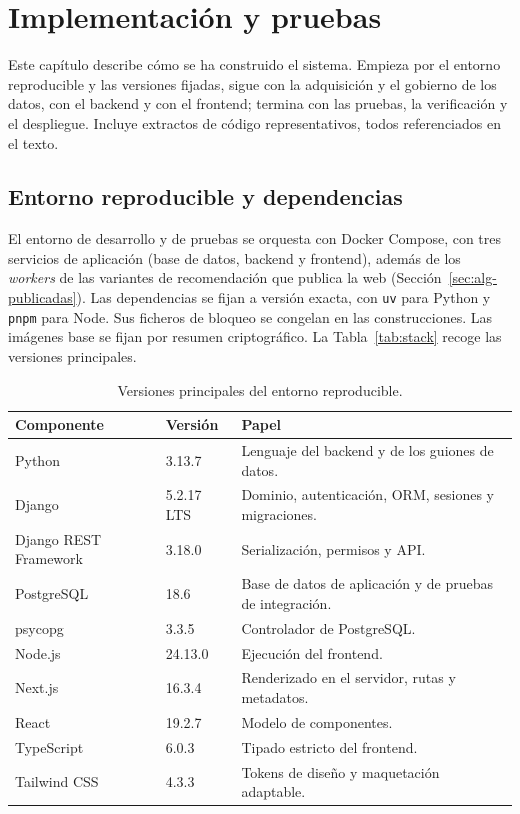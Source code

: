 \chapter{Implementación y pruebas}\label{cap:implementacion}\label{ap:implementacion-detallada}

Este capítulo describe cómo se ha construido el sistema. Empieza por el entorno reproducible y
las versiones fijadas, sigue con la adquisición y el gobierno de los datos, con el backend y con
el frontend; termina con las pruebas, la verificación y el despliegue. Incluye extractos de
código representativos, todos referenciados en el texto.

\section{Entorno reproducible y dependencias}\label{sec:impl-entorno}\label{sec:datos-dependencias}

El entorno de desarrollo y de pruebas se orquesta con Docker Compose, con tres servicios de
aplicación (base de datos, backend y frontend), además de los \textit{workers} de las variantes
de recomendación que publica la web (Sección~\ref{sec:alg-publicadas}). Las dependencias se fijan a versión exacta, con
\texttt{uv} para Python y \texttt{pnpm} para Node. Sus ficheros de bloqueo se congelan en las
construcciones. Las imágenes base se fijan por resumen criptográfico. La
Tabla~\ref{tab:stack} recoge las versiones principales.

\begin{table}[htp]
\centering
\begin{tabularx}{\textwidth}{ | L{0.24\textwidth} | C{0.18\textwidth} | Y | }
    \hline
    \textbf{Componente} & \textbf{Versión} & \textbf{Papel} \\
    \hline
    Python & 3.13.7 & Lenguaje del backend y de los guiones de datos. \\
    \hline
    Django & 5.2.17 LTS & Dominio, autenticación, ORM, sesiones y migraciones. \\
    \hline
    Django REST Framework & 3.18.0 & Serialización, permisos y API. \\
    \hline
    PostgreSQL & 18.6 & Base de datos de aplicación y de pruebas de integración. \\
    \hline
    psycopg & 3.3.5 & Controlador de PostgreSQL. \\
    \hline
    Node.js & 24.13.0 & Ejecución del frontend. \\
    \hline
    Next.js & 16.3.4 & Renderizado en el servidor, rutas y metadatos. \\
    \hline
    React & 19.2.7 & Modelo de componentes. \\
    \hline
    TypeScript & 6.0.3 & Tipado estricto del frontend. \\
    \hline
    Tailwind CSS & 4.3.3 & Tokens de diseño y maquetación adaptable. \\
    \hline
\end{tabularx}
\caption{Versiones principales del entorno reproducible.}
\label{tab:stack}\label{tab:stack-resumen}
\end{table}

